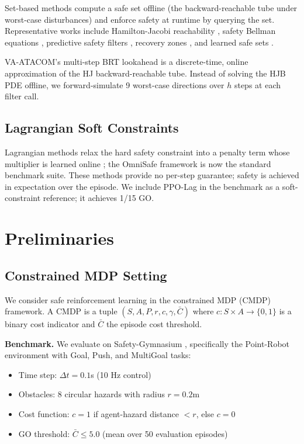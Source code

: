 \documentclass[letterpaper]{article}
\begin{document}
Set-based methods compute a safe set offline (the backward-reachable tube under worst-case disturbances) and enforce safety at runtime by querying the set. Representative works include Hamilton-Jacobi reachability \cite{mitchell2005,bansal2017}, safety Bellman equations \cite{fisac2018,fisac2019,hsu2021}, predictive safety filters \cite{wabersich2018,wabersich2021}, recovery zones \cite{thananjeyan2021}, and learned safe sets \cite{robey2020}.

VA-ATACOM's multi-step BRT lookahead is a discrete-time, online approximation of the HJ backward-reachable tube. Instead of solving the HJB PDE offline, we forward-simulate 9 worst-case directions over $h$ steps at each filter call.

\subsection{Lagrangian Soft Constraints}

Lagrangian methods relax the hard safety constraint into a penalty term whose multiplier is learned online \cite{achiam2017,ray2019,tessler2018,yang2020,stooke2020}; the OmniSafe framework \cite{ji2024} is now the standard benchmark suite. These methods provide no per-step guarantee; safety is achieved in expectation over the episode. We include PPO-Lag in the benchmark as a soft-constraint reference; it achieves 1/15 GO.

\section{Preliminaries}

\subsection{Constrained MDP Setting}

We consider safe reinforcement learning in the constrained MDP (CMDP) framework. A CMDP is a tuple $(S, A, P, r, c, \gamma, \bar{C})$ where $c: S \times A \to \{0, 1\}$ is a binary cost indicator and $\bar{C}$ the episode cost threshold.

\textbf{Benchmark.} We evaluate on Safety-Gymnasium \cite{ji2023}, specifically the Point-Robot environment with Goal, Push, and MultiGoal tasks:
\begin{itemize}
\item Time step: $\Delta t = 0.1$s (10 Hz control)
\item Obstacles: 8 circular hazards with radius $r = 0.2$m
\item Cost function: $c = 1$ if agent-hazard distance $< r$, else $c = 0$
\item GO threshold: $\bar{C} \le 5.0$ (mean over 50 evaluation episodes)
\end{itemize}
\end{document}
